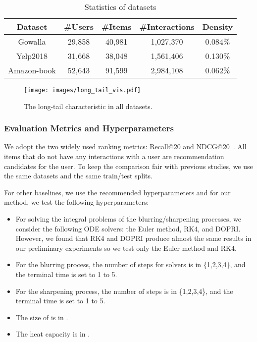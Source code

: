 \documentclass[sigconf,natbib=true]{acmart}
\begin{document}
\begin{table}[t]
    \small
    \centering
    \caption{Statistics of datasets}\label{tbl:data}
    \begin{tabular}{ccccc}\toprule
        Dataset     & \#Users & \#Items & \#Interactions & Density \\ \midrule
        Gowalla     & 29,858  & 40,981  & 1,027,370      & 0.084\% \\
        Yelp2018    & 31,668  & 38,048  & 1,561,406      & 0.130\% \\
        Amazon-book & 52,643  & 91,599  & 2,984,108      & 0.062\% \\
        \bottomrule
    \end{tabular}
\end{table}

\begin{figure}[t]
    \centering
\texttt{[image: images/long\_tail\_vis.pdf]}
    \caption{The long-tail characteristic in all datasets.}\label{fig:longtail}
\end{figure}


\subsubsection{Evaluation Metrics and Hyperparameters}
We adopt the two widely used ranking metrics: Recall@20 and NDCG@20~\cite{Jarvelin2002NDCG}. All items that do not have any interactions with a user are recommendation candidates for the user. To keep the comparison fair with previous studies, we use the same datasets and the same train/test splits.

For other baselines, we use the recommended hyperparameters and for our method, we test the following hyperparameters:
\begin{itemize}
    \item For solving the integral problems of the blurring/sharpening processes, we consider the following ODE solvers: the Euler method, RK4, and DOPRI. However, we found that RK4 and DOPRI produce almost the same results in our preliminary experiments so we test only the Euler method and RK4.
    \item For the blurring process, the number of steps  for solvers is in \{1,2,3,4\}, and the terminal time  is set to 1 to 5. 
    \item For the sharpening process, the number of steps  is in \{1,2,3,4\}, and the terminal time  is set to 1 to 5.
    \item The size of  is in .
    \item The heat capacity  is in .
\end{itemize}
\end{document}
